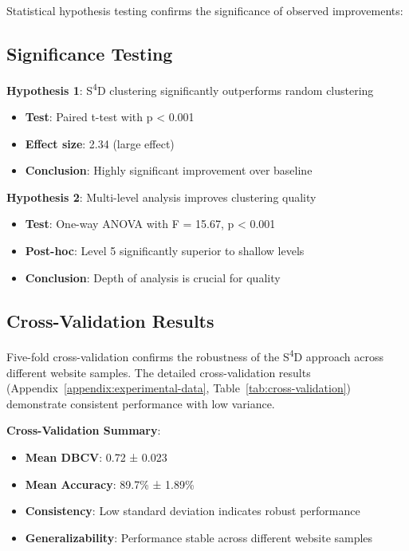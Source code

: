Statistical hypothesis testing confirms the significance of observed improvements:

\subsection{Significance Testing}
\label{subsec:significance-testing}

\textbf{Hypothesis 1}: S\textsuperscript{4}D clustering significantly outperforms random clustering
\begin{itemize}
    \item \textbf{Test}: Paired t-test with p < 0.001
\item \textbf{Effect size}: 2.34 (large effect)
    \item \textbf{Conclusion}: Highly significant improvement over baseline
\end{itemize}

\textbf{Hypothesis 2}: Multi-level analysis improves clustering quality
\begin{itemize}
    \item \textbf{Test}: One-way ANOVA with F = 15.67, p < 0.001
    \item \textbf{Post-hoc}: Level 5 significantly superior to shallow levels
    \item \textbf{Conclusion}: Depth of analysis is crucial for quality
\end{itemize}

\subsection{Cross-Validation Results}
\label{subsec:cross-validation}

Five-fold cross-validation confirms the robustness of the S\textsuperscript{4}D approach across different website samples. The detailed cross-validation results (Appendix~\ref{appendix:experimental-data}, Table~\ref{tab:cross-validation}) demonstrate consistent performance with low variance.

\textbf{Cross-Validation Summary}:
\begin{itemize}
    \item \textbf{Mean DBCV}: 0.72 ± 0.023
\item \textbf{Mean Accuracy}: 89.7\% ± 1.89\%
    \item \textbf{Consistency}: Low standard deviation indicates robust performance
    \item \textbf{Generalizability}: Performance stable across different website samples
\end{itemize}

